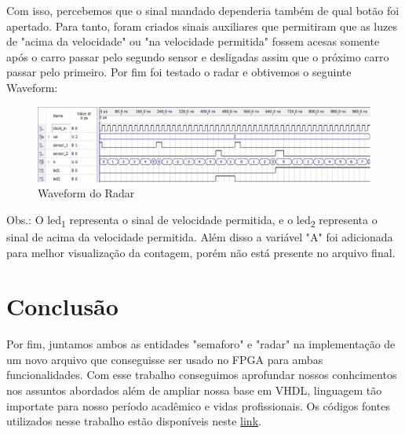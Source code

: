 Com isso, percebemos que o sinal mandado dependeria também de qual botão foi apertado. Para tanto, foram criados sinais auxiliares que permitiram que as luzes de "acima da velocidade" ou "na velocidade permitida" fossem acesas somente após o carro passar pelo segundo sensor e desligadas assim que o próximo carro passar pelo primeiro. Por fim foi testado o radar e obtivemos o seguinte Waveform:
\begin{figure}
\caption{Waveform do Radar}
\centering
\includegraphics[width=0.99\columnwidth]{waveformradar.png}
\end{figure}
Obs.: O led\textsubscript{1} representa o sinal de velocidade permitida, e o led\textsubscript{2} representa o sinal de acima da velocidade permitida. Além disso a variável "A" foi adicionada para melhor visualização da contagem, porém não está presente no arquivo final.

\section{Conclusão}
\setlength{\parindent}{2cm}

Por fim, juntamos ambos as entidades "semaforo" e "radar" na implementação de um novo arquivo que conseguisse ser usado no FPGA para ambas funcionalidades. Com esse trabalho conseguimos aprofundar nossos conhcimentos nos assuntos abordados além de ampliar nossa base em VHDL, linguagem tão importate para nosso período acadêmico e vidas profissionais.
Os códigos fontes utilizados nesse trabalho estão disponíveis neste \href{https://github.com/angelomarcelino/circuitos-digitais/tree/master/Mobilidade_Urbana}{link}.